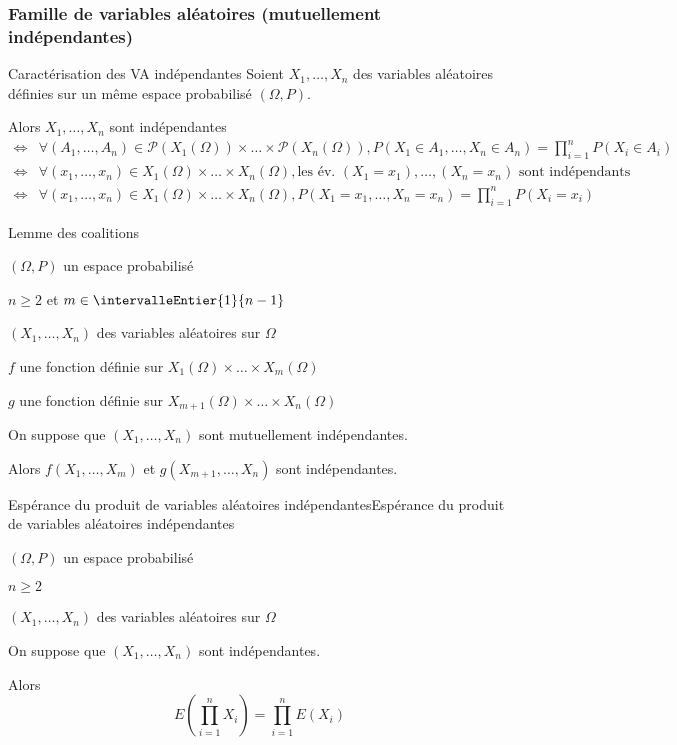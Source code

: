     \subsubsection{Famille de variables aléatoires (mutuellement indépendantes)}

    \begin{prop}{Caractérisation des VA indépendantes}{}
        Soient $X_1,\ldots,X_n$ des variables aléatoires définies sur un même espace probabilisé $(\Omega,P)$.

        Alors $X_1,\ldots,X_n$ sont indépendantes 
        \begin{align*}
            \iff &  \forall (A_1,\ldots,A_n) \in \mathcal{P}(X_1(\Omega)) \times \ldots \times \mathcal{P}(X_n(\Omega)), P(X_1 \in A_1,\ldots, X_n \in A_n) = \prod\limits_{i=1}^n P(X_i \in A_i) \\
            \iff & \forall (x_1,\ldots,x_n) \in X_1(\Omega) \times \ldots \times X_n(\Omega), \text{les év. } (X_1 = x_1), \ldots, (X_n = x_n) \text{ sont indépendants} \\
            \iff & \forall (x_1,\ldots,x_n) \in X_1(\Omega) \times \ldots \times X_n(\Omega), P(X_1=x_1,\ldots,X_n=x_n) = \prod\limits_{i=1}^n P(X_i = x_i)
        \end{align*}
    \end{prop}

    \begin{prop}{Lemme des coalitions}{}
        \begin{soient}
            \item $(\Omega,P)$ un espace probabilisé
            \item $n \geq 2$ et $m \in \intervalleEntier{1}{n-1}$
            \item $(X_1,\ldots,X_n)$ des variables aléatoires sur $\Omega$
            \item $f$ une fonction définie sur $X_1(\Omega) \times \ldots \times X_m(\Omega)$
            \item $g$ une fonction définie sur $X_{m+1}(\Omega) \times \ldots \times X_n(\Omega)$
        \end{soient}
        On suppose que $(X_1,\ldots,X_n)$ sont mutuellement indépendantes.

        Alors $f(X_1,\ldots,X_{m})$ et $g(X_{m+1},\ldots,X_n)$ sont indépendantes.
    \end{prop}

    \begin{prop}{Espérance du produit de variables aléatoires indépendantes}{Espérance du produit de variables aléatoires indépendantes}
        \begin{soient}
            \item $(\Omega,P)$ un espace probabilisé
            \item $n \geq 2$
            \item $(X_1,\ldots,X_n)$ des variables aléatoires sur $\Omega$
        \end{soient}
        On suppose que $(X_1,\ldots,X_n)$ sont indépendantes.

        Alors 
        \[ E\left(\prod\limits_{i=1}^n X_i\right) = \prod\limits_{i=1}^n E(X_i) \] 
    \end{prop}

